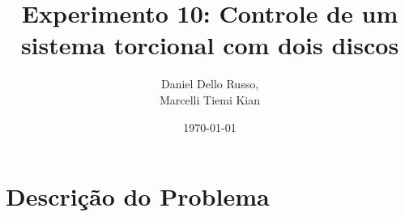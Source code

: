 \documentclass{beamer}
\title[Experimento 10]{Experimento 10: Controle de um sistema torcional com dois discos} %
\author{Daniel Dello Russo,\\ Marcelli Tiemi Kian} %
\institute[FEM] %
{
Universidade Estadual de Campinas \\ %
\medskip
\textit{} %
}
\date{\today} %
\begin{document}
\begin{frame}
\titlepage %
\end{frame}

\begin{frame}

\tableofcontents %
\end{frame}


\section{Descrição do Problema} 
\end{document}
